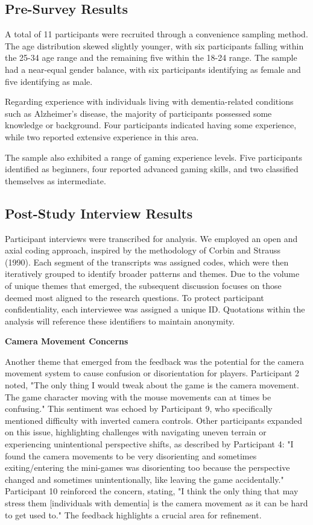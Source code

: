 \documentclass{l4proj}
\begin{document}
\subsection{Pre-Survey Results}
A total of 11 participants were recruited through a convenience sampling method.  The age distribution skewed slightly younger, with six participants falling within the 25-34 age range and the remaining five within the 18-24 range.  The sample had a near-equal gender balance, with six participants identifying as female and five identifying as male.

Regarding experience with individuals living with dementia-related conditions such as Alzheimer's disease, the majority of participants possessed some knowledge or background. Four participants indicated having some experience, while two reported extensive experience in this area.

The sample also exhibited a range of gaming experience levels. Five participants identified as beginners, four reported advanced gaming skills, and two classified themselves as intermediate.

\subsection{Post-Study Interview Results}
Participant interviews were transcribed for analysis. We employed an open and axial coding approach, inspired by the methodology of Corbin and Strauss (1990).  Each segment of the transcripts was assigned codes, which were then iteratively grouped to identify broader patterns and themes. Due to the volume of unique themes that emerged, the subsequent discussion focuses on those deemed most aligned to the research questions. To protect participant confidentiality, each interviewee was assigned a unique ID. Quotations within the analysis will reference these identifiers to maintain anonymity.
\newline

\textbf{Camera Movement Concerns}

Another theme that emerged from the feedback was the potential for the camera movement system to cause confusion or disorientation for players. Participant 2 noted, "The only thing I would tweak about the game is the camera movement. The game character moving with the mouse movements can at times be confusing." This sentiment was echoed by Participant 9, who specifically mentioned difficulty with inverted camera controls. Other participants expanded on this issue, highlighting challenges with navigating uneven terrain or experiencing unintentional perspective shifts, as described by Participant 4:  "I found the camera movements to be very disorienting and sometimes exiting/entering the mini-games was disorienting too because the perspective changed and sometimes unintentionally, like leaving the game accidentally." Participant 10 reinforced the concern, stating, "I think the only thing that may stress them [individuals with dementia] is the camera movement as it can be hard to get used to." The feedback highlights a crucial area for refinement. 
\end{document}
